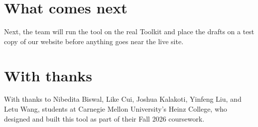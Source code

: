 \section*{What comes next}
Next, the team will run the tool on the real Toolkit and place the drafts on a test copy of our website before anything goes near the live site.

\section*{With thanks}
With thanks to Nibedita Biswal, Like Cui, Joshua Kalakoti, Yinfeng Liu, and Letu Wang, students at Carnegie Mellon University's Heinz College, who designed and built this tool as part of their Fall 2026 coursework.


